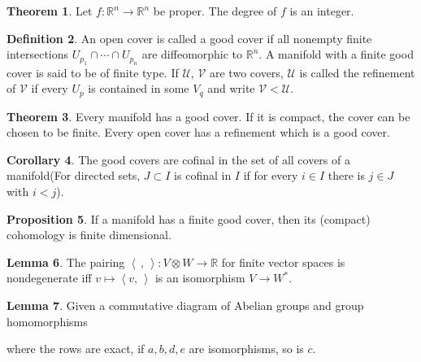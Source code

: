 \documentclass[twocolumn]{article}
\theoremstyle{definition}
\newtheorem{definition}{Definition}[section]
\newtheorem{theorem}[definition]{Theorem}
\newtheorem{lemma}[definition]{Lemma}
\newtheorem{proposition}[definition]{Proposition}
\newtheorem{corollary}[definition]{Corollary}
\theoremstyle{remark}
\begin{document}
\begin{theorem}
    Let $f: \mathbb{R}^n \rightarrow \mathbb{R}^n$ be proper. The degree of $f$ is an integer.
\end{theorem}
\begin{definition}
    An open cover is called a good cover if all nonempty finite intersections
    $U_{p_1} \cap \cdots \cap U_{p_n}$ are diffeomorphic to $\mathbb{R}^n$. A manifold with a finite good cover is said to be of finite type.
    If $\mathcal{U}$, $\mathcal{V}$ are two covers, $\mathcal{U}$ is called the refinement of $\mathcal{V}$
    if every $U_p$ is contained in some $V_q$ and write $\mathcal{V} < \mathcal{U}$.
\end{definition}
\begin{theorem}
    Every manifold has a good cover. If it is compact, the cover can be chosen to be finite.
    Every open cover has a refinement which is a good cover.
\end{theorem}
\begin{corollary}
    The good covers are cofinal in the set of all covers of a manifold(For directed sets, $J \subset I$ is cofinal in $I$ if for every $i\in I$ there is $j\in J$ with $i<j$).
\end{corollary}
\begin{proposition}
    If a manifold has a finite good cover, then its (compact) cohomology is finite dimensional.
\end{proposition}
\begin{lemma}
    The pairing $\left\langle \,,\,\right\rangle : V \otimes  W \rightarrow \mathbb{R}$ for finite vector spaces is nondegenerate iff $v \mapsto\left\langle v,\,  \right\rangle$ is an isomorphism $V\rightarrow W^*$.
\end{lemma}
\begin{lemma}
    Given a commutative diagram of Abelian groups and group homomorphisms
    \begin{center}
    \end{center}
    where the rows are exact, if $a, b, d, e$ are isomorphisms, so is $c$.
\end{lemma}
\end{document}
